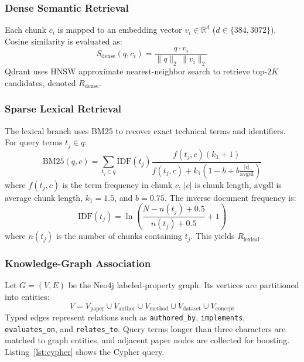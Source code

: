 \documentclass[conference]{IEEEtran}
\begin{document}
\subsubsection{Dense Semantic Retrieval}
Each chunk $c_i$ is mapped to an embedding vector $v_i \in \mathbb{R}^d$ ($d \in \{384, 3072\}$). Cosine similarity is evaluated as:
\begin{equation}
S_{\mathrm{dense}}(q, c_i) = \frac{q \cdot v_i}{\|q\|_2 \, \|v_i\|_2}
\label{eq:cosine}
\end{equation}
Qdrant uses HNSW approximate nearest-neighbor search to retrieve top-$2K$ candidates, denoted $R_{\mathrm{dense}}$.



\subsubsection{Sparse Lexical Retrieval}
The lexical branch uses BM25 to recover exact technical terms and identifiers. For query terms $t_j \in q$:
\begin{equation}
\mathrm{BM25}(q, c) = \sum_{t_j \in q} \mathrm{IDF}(t_j) \frac{f(t_j, c)(k_1 + 1)}{f(t_j, c) + k_1\left(1 - b + b\frac{|c|}{\mathrm{avgdl}}\right)}
\label{eq:bm25}
\end{equation}
where $f(t_j, c)$ is the term frequency in chunk $c$, $|c|$ is chunk length, $\mathrm{avgdl}$ is average chunk length, $k_1 = 1.5$, and $b = 0.75$. The inverse document frequency is:
\begin{equation}
\mathrm{IDF}(t_j) = \ln\left(\frac{N - n(t_j) + 0.5}{n(t_j) + 0.5} + 1\right)
\label{eq:idf}
\end{equation}
where $n(t_j)$ is the number of chunks containing $t_j$. This yields $R_{\mathrm{lexical}}$.

\subsubsection{Knowledge-Graph Association}
Let $G = (V, E)$ be the Neo4j labeled-property graph. Its vertices are partitioned into entities:
\begin{equation}
V = V_{\mathrm{paper}} \cup V_{\mathrm{author}} \cup V_{\mathrm{method}} \cup V_{\mathrm{dataset}} \cup V_{\mathrm{concept}}
\label{eq:vertices}
\end{equation}
Typed edges represent relations such as \texttt{authored\_by}, \texttt{implements}, \texttt{evaluates\_on}, and \texttt{relates\_to}. Query terms longer than three characters are matched to graph entities, and adjacent paper nodes are collected for boosting. Listing~\ref{lst:cypher} shows the Cypher query.
\end{document}
